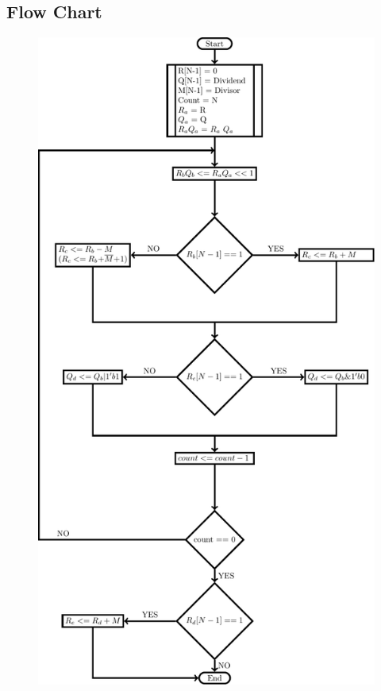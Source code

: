 \documentclass{article}
\begin{document}
\subsection{Flow Chart}
\begin{figure}[H]
    \centering
    \includegraphics[scale=0.8]{../Resources/TexFiles/NonRestoringDivision.pdf}
\end{figure}
\end{document}
